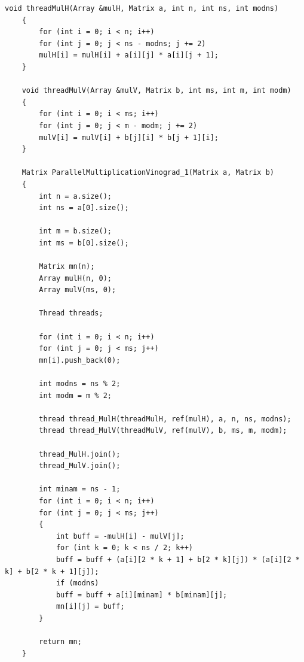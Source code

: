 \documentclass[12pt]{report}
\begin{document}
\newpage
\begin{lstlisting}[label=some-code,caption=Распараллеливание двойных циклов в оптимизированном алгоритме Винограда]	
	void threadMulH(Array &mulH, Matrix a, int n, int ns, int modns)
	{
		for (int i = 0; i < n; i++)
		for (int j = 0; j < ns - modns; j += 2)
		mulH[i] = mulH[i] + a[i][j] * a[i][j + 1];
	}
	
	void threadMulV(Array &mulV, Matrix b, int ms, int m, int modm)
	{
		for (int i = 0; i < ms; i++)
		for (int j = 0; j < m - modm; j += 2)
		mulV[i] = mulV[i] + b[j][i] * b[j + 1][i];
	}

	Matrix ParallelMultiplicationVinograd_1(Matrix a, Matrix b)
	{
		int n = a.size();
		int ns = a[0].size();
		
		int m = b.size();
		int ms = b[0].size();
		
		Matrix mn(n);
		Array mulH(n, 0);
		Array mulV(ms, 0);
		
		Thread threads;
		
		for (int i = 0; i < n; i++)
		for (int j = 0; j < ms; j++)
		mn[i].push_back(0);
		
		int modns = ns % 2;
		int modm = m % 2;
		
		thread thread_MulH(threadMulH, ref(mulH), a, n, ns, modns);
		thread thread_MulV(threadMulV, ref(mulV), b, ms, m, modm);
		
		thread_MulH.join();
		thread_MulV.join();
		
		int minam = ns - 1;
		for (int i = 0; i < n; i++)
		for (int j = 0; j < ms; j++)
		{
			int buff = -mulH[i] - mulV[j];
			for (int k = 0; k < ns / 2; k++)
			buff = buff + (a[i][2 * k + 1] + b[2 * k][j]) * (a[i][2 * k] + b[2 * k + 1][j]);
			if (modns)
			buff = buff + a[i][minam] * b[minam][j];
			mn[i][j] = buff;
		}
		
		return mn;
	}
\end{lstlisting}
\newpage
\end{document}

